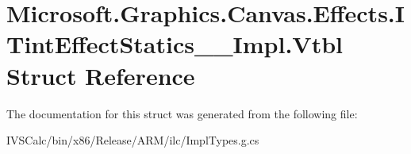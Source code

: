 \hypertarget{struct_microsoft_1_1_graphics_1_1_canvas_1_1_effects_1_1_i_tint_effect_statics_____impl_1_1_vtbl}{}\section{Microsoft.\+Graphics.\+Canvas.\+Effects.\+I\+Tint\+Effect\+Statics\+\_\+\+\_\+\+Impl.\+Vtbl Struct Reference}
\label{struct_microsoft_1_1_graphics_1_1_canvas_1_1_effects_1_1_i_tint_effect_statics_____impl_1_1_vtbl}


The documentation for this struct was generated from the following file\+:\begin{DoxyCompactItemize}
\item 
I\+V\+S\+Calc/bin/x86/\+Release/\+A\+R\+M/ilc/Impl\+Types.\+g.\+cs\end{DoxyCompactItemize}
